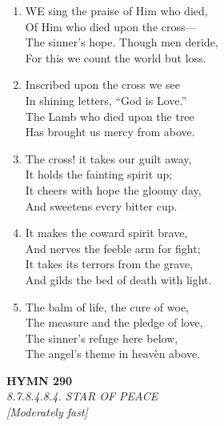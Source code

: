 \begin{enumerate}
    \item WE sing the praise of Him who died, \\
        Of Him who died upon the cross--- \\
        The sinner's hope. Though men deride, \\
        For this we count the world but loss.

    \item Inscribed upon the cross we see \\
        In shining letters, ``God is Love.'' \\
        The Lamb who died upon the tree \\
        Has brought us mercy from above.

    \item The cross! it takes our guilt away, \\
        It holds the fainting spirit up; \\
        It cheers with hope the gloomy day, \\
        And sweetens every bitter cup.

    \item It makes the coward spirit brave, \\
        And nerves the feeble arm for fight; \\
        It takes its terrors from the grave, \\
        And gilds the bed of death with light.

    \item The balm of life, the cure of woe, \\
        The measure and the pledge of love, \\
        The sinner's refuge here below, \\
        The angel's theme in heav\`en above.

\end{enumerate}

\newpage
\begin{center}
    {\Large \textbf{HYMN 290}}
    \\
    \textit{8.7.8.4.8.4. STAR OF PEACE}
    \\
    \textit{\small [Moderately fast]}
\end{center}
\vspace{1em}

